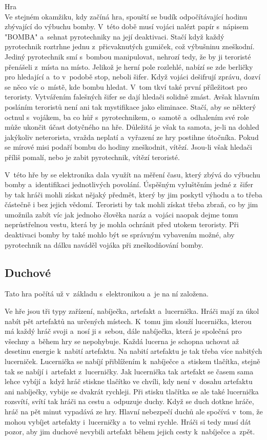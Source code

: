 Hra\\
Ve stejném okamžiku, kdy začíná hra, spouští se budík odpočítávající hodinu zbývající do výbuchu bomby. 
V~této době musí vojáci nalézt papír s~nápisem "BOMBA" a~sehnat pyrotechniky na její deaktivaci. 
Stačí když každý pyrotechnik roztrhne jednu z~přicvaknutých gumiček, což výbušninu zneškodní. 
Jediný pyrotechnik smí s~bombou manipulovat, nehrozí tedy, že by ji teroristé přenášeli z~místa na místo.
Jelikož je herní pole rozlehlé, nabízí se zde berličky pro hledající a~to v~podobě stop, neboli šifer. 
Když vojáci dešifrují zprávu, dozví se něco víc o~místě, kde bombu hledat. 
V~tom tkví také první příležitost pro teroristy. 
Vytvářením falešných šifer se dají hledači solidně zmást.
Avšak hlavním posláním teroristů není ani tak mystifikace jako eliminace. 
Stačí, aby se některý octnul s~vojákem, ba co hůř s~pyrotechnikem, o~samotě a~odhalením své role může ukončit účast dotyčného na hře. 
Důležitá je však ta samota, je-li na dohled jakýkoliv neterorista, vražda neplatí a~vyřazení ze hry postihne útočníka.
Pokud se mírové misi podaří bombu do hodiny zneškodnit, vítězí. 
Jsou-li však hledači příliš pomalí, nebo je zabit pyrotechnik, vítězí teroristé.

V~této hře by se elektronika dala využít na měření času, který zbývá do výbuchu bomby a~identifikaci jednotlivých povolání.
Úspěšným vyluštěním jedné z~šifer by tak hráči mohli získat nějaký předmět, který by jim poskytl výhodu a to třeba částečně i bez jejich vědomí.
Teroristi by tak mohli získat třeba zbraň, co by jim umožnila zabít víc jak jednoho člověka naráz a~vojáci naopak dejme tomu neprůstřelnou vestu, která by je mohla ochránit před utokem teroristy.
Při deaktivaci bomby by také mohlo být se správným vybavením možné, aby pyrotechnik na dálku naváděl vojáka při zneškodňování bomby.

\subsection{Duchové}
Tato hra počítá už v~základu s~elektronikou a~je na ní založena.

Ve hře jsou tři typy zařízení, nabíječka, artefakt a~lucernička.
Hráči mají za úkol nabít pět artefaktů na určených místech.
K~tomu jim slouží lucernička, kterou má každý hráč svoji a~nosí ji s~sebou, dále nabíječka, která je společná pro všechny a~během hry se nepohybuje.
Každá lucerna je schopna uchovat až desetinu energie k~nabití artefaktu. 
Na nabití artefaktu je tak třeba více nabitých lucerniček.
Lucernička se nabíjí přiblížením k~nabíječce a~stiskem tlačítka, stejně tak se nabíjí i~artefakt z~lucerničky.
Jak lucernička tak artefakt se časem sama lehce vybíjí a~když hráč stiskne tlačítko ve chvíli, kdy není v~dosahu artefaktu ani nabíječky, vybije se dvakrát rychleji.
Při stisku tlačítka se ale také lucernička rozsvítí, svítí tak hráči na cestu a~odpuzuje duchy.
Když se duch dotkne hráče, hráč na pět minut vypadává ze hry.
Hlavní nebezpečí duchů ale spočívá v~tom, že mohou vybíjet artefakty i~lucerničky a~to velmi rychle.
Hráči si tedy musí dát pozor, aby jim duchové nevybili artefakt během jejich cesty k~nabíječce a~zpět.

